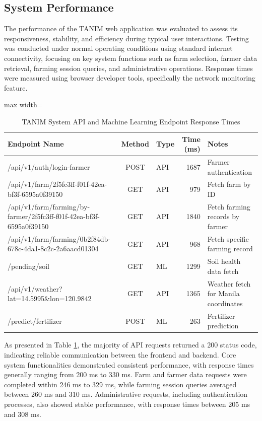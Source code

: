 {	\subsection{System Performance}
	
	The performance of the TANIM web application was evaluated to assess its responsiveness, stability, and efficiency during typical user interactions. Testing was conducted under normal operating conditions using standard internet connectivity, focusing on key system functions such as farm selection, farmer data retrieval, farming session queries, and administrative operations. Response times were measured using browser developer tools, specifically the network monitoring feature.
	
	\begin{table}[ht]
		\centering
		\caption{TANIM System API and Machine Learning Endpoint Response Times}
		\label{tab:api_latency}
		\begin{adjustbox}{max width=\textwidth}
			\begin{tabular}{l c l r l}
				\toprule
				\textbf{Endpoint Name} & \textbf{Method} & \textbf{Type} & \textbf{Time (ms)} & \textbf{Notes} \\
				\midrule
				/api/v1/auth/login-farmer & POST & API & 1687 & Farmer authentication \\
				/api/v1/farm/2f5fc3ff-f01f-42ea-bf3f-6595a0f39150 & GET & API & 979 & Fetch farm by ID \\
				/api/v1/farm/farming/by-farmer/2f5fc3ff-f01f-42ea-bf3f-6595a0f39150 & GET & API & 1840 & Fetch farming records by farmer \\
				/api/v1/farm/farming/0b2f84db-678c-4da1-8c2c-2a6aacd01304 & GET & API & 968 & Fetch specific farming record \\
				/pending/soil & GET & ML & 1299 & Soil health data fetch \\
				/api/v1/weather?lat=14.5995\&lon=120.9842 & GET & API & 1365 & Weather fetch for Manila coordinates \\
				/predict/fertilizer & POST & ML & 263 & Fertilizer prediction \\
				\bottomrule
			\end{tabular}
		\end{adjustbox}
	\end{table}
	
	As presented in Table \ref{tab:api_latency}, the majority of API requests returned a 200 status code, indicating reliable communication between the frontend and backend. Core system functionalities demonstrated consistent performance, with response times generally ranging from 200 ms to 330 ms. Farm and farmer data requests were completed within 246 ms to 329 ms, while farming session queries averaged between 260 ms and 310 ms. Administrative requests, including authentication processes, also showed stable performance, with response times between 205 ms and 308 ms.
	
}
